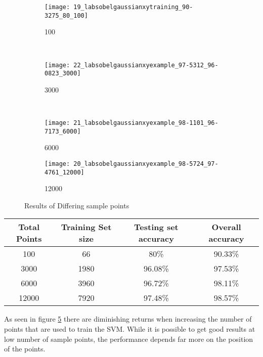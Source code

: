 \begin{figure}[h]
        \centering
        \begin{subfigure}[b]{0.2\textwidth}
                \centering
                \texttt{[image: 19\_labsobelgaussianxytraining\_90-3275\_80\_100]}
                \caption{100}
                \label{fig:19_labsobelgaussianxytraining_90.3275_80_100}
        \end{subfigure}%
        ~ %
        \begin{subfigure}[b]{0.2\textwidth}
                \centering

                \texttt{[image: 22\_labsobelgaussianxyexample\_97-5312\_96-0823\_3000]}
                \caption{3000}
                \label{fig:22_labsobelgaussianxyexample_97.5312_96.0823_3000}     
        \end{subfigure}
        ~
        \begin{subfigure}[b]{0.2\textwidth}
                \centering

                \texttt{[image: 21\_labsobelgaussianxyexample\_98-1101\_96-7173\_6000]}
                \caption{6000}
                \label{fig:21_labsobelgaussianxyexample_98.1101_96.7173_6000}     
        \end{subfigure}
        \begin{subfigure}[b]{0.2\textwidth}
                \centering

                \texttt{[image: 20\_labsobelgaussianxyexample\_98-5724\_97-4761\_12000]}
                \caption{12000}
                \label{fig:20_labsobelgaussianxyexample_98.5724_97.4761_12000}     
        \end{subfigure}
        \caption{Results of Differing sample points}\label{fig:samplepoints}
\end{figure}

\begin{center}
  \begin{tabular}{| c | c | c | c | }
    \hline
    \textbf{Total Points} & \textbf{Training Set size} & \textbf{Testing set accuracy} & \textbf{Overall accuracy} \\ \hline
    100 & 66 & 80\% & 90.33\% \\ \hline
    3000 & 1980 & 96.08\% & 97.53\% \\ \hline
    6000 & 3960 & 96.72\% & 98.11\% \\ \hline
    12000 & 7920 & 97.48\% & 98.57\% \\ 
    \hline
  \end{tabular}
\end{center}

As seen in figure \ref{fig:samplepoints} there are diminishing returns when increasing the number of points that are used to train the SVM. While it is possible to get good results at low number of sample points, the performance depends far more on the position of the points.